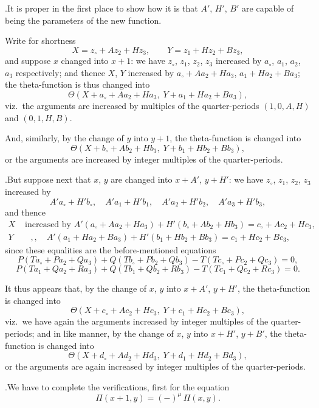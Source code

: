 \documentclass[11pt]{article}
\begin{document}
\medskip

.\quad It is proper in the first place to show how it is that $A'$, $H'$, $B'$ are capable of being the parameters of the new function.

Write for shortness
\[
X = z_{\circ}+Az_2+Hz_3,\qquad Y = z_1+Hz_2+Bz_3,
\]
and suppose $x$ changed into $x+1$: we have $z_{\circ}$, $z_1$, $z_2$, $z_3$ increased by $a_{\circ}$, $a_1$, $a_2$, $a_3$ respectively; and thence $X$, $Y$ increased by $a_{\circ}+Aa_2+Ha_3$, $a_1+Ha_2+Ba_3$; the theta-function is thus changed into
\[
\Theta(X+a_{\circ}+Aa_2+Ha_3,\; Y+a_1+Ha_2+Ba_3),
\]
viz.\ the arguments are increased by multiples of the quarter-periods $(1,0,A,H)$ and $(0,1,H,B)$.

\medskip

\noindent And, similarly, by the change of $y$ into $y+1$, the theta-function is changed into
\[
\Theta(X+b_{\circ}+Ab_2+Hb_3,\; Y+b_1+Hb_2+Bb_3),
\]
or the arguments are increased by integer multiples of the quarter-periods.

\medskip

.\quad But suppose next that $x$, $y$ are changed into $x+A'$, $y+H'$: we have $z_{\circ}$, $z_1$, $z_2$, $z_3$ increased by
\[
A'a_{\circ}+H'b_{\circ},\quad A'a_1+H'b_1,\quad A'a_2+H'b_2,\quad A'a_3+H'b_3,
\]
and thence
\begin{align*}
X &\text{ increased by } A'(a_{\circ}+Aa_2+Ha_3)+H'(b_{\circ}+Ab_2+Hb_3) = c_{\circ}+Ac_2+Hc_3,\\
Y &\quad,, \quad A'(a_1+Ha_2+Ba_3)+H'(b_1+Hb_2+Bb_3) = c_1+Hc_2+Bc_3,
\end{align*}
since these equalities are the before-mentioned equations
\[
P(Ta_{\circ}+Pa_2+Qa_3)+Q(Tb_{\circ}+Pb_2+Qb_3)-T(Tc_{\circ}+Pc_2+Qc_3) = 0,
\]
\[
P(Ta_1+Qa_2+Ra_3)+Q(Tb_1+Qb_2+Rb_3)-T(Tc_1+Qc_2+Rc_3) = 0.
\]

It thus appears that, by the change of $x$, $y$ into $x+A'$, $y+H'$, the theta-function is changed into
\[
\Theta(X+c_{\circ}+Ac_2+Hc_3,\; Y+c_1+Hc_2+Bc_3),
\]
viz.\ we have again the arguments increased by integer multiples of the quarter-periods; and in like manner, by the change of $x$, $y$ into $x+H'$, $y+B'$, the theta-function is changed into
\[
\Theta(X+d_{\circ}+Ad_2+Hd_3,\; Y+d_1+Hd_2+Bd_3),
\]
or the arguments are again increased by integer multiples of the quarter-periods.

\medskip

.\quad We have to complete the verifications, first for the equation
\[
\Pi(x+1,y) = (-)^{\mu}\,\Pi(x,y).
\]
\end{document}
